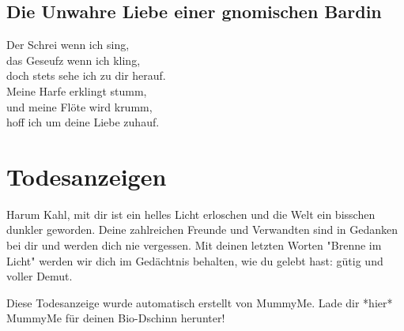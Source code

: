 \documentclass[final]{multiversum}
\begin{document}
\subsection{Die Unwahre Liebe einer gnomischen Bardin}
\begin{center}
      Der Schrei wenn ich sing,\\
      das Geseufz wenn ich kling,\\
      doch stets sehe ich zu dir herauf.\\
      Meine Harfe erklingt stumm,\\
      und meine Flöte wird krumm,\\
      hoff ich um deine Liebe zuhauf.\\
\end{center}



\section{Todesanzeigen}


Harum Kahl, mit dir ist ein helles Licht erloschen und die Welt ein bisschen dunkler geworden.
Deine zahlreichen Freunde und Verwandten sind in Gedanken bei dir und werden dich nie vergessen.
Mit deinen letzten Worten "Brenne im Licht" werden wir dich im Gedächtnis behalten, wie du gelebt hast: gütig und voller Demut.

Diese Todesanzeige wurde automatisch erstellt von MummyMe.
Lade dir *hier* MummyMe für deinen Bio-Dschinn herunter!


\end{document}
